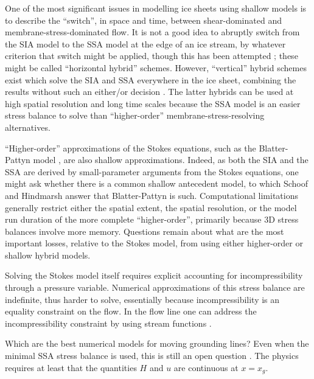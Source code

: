 \documentclass[letterpaper,final,12pt,reqno]{amsart}
\begin{document}
One of the most significant issues in modelling ice sheets using shallow models is to describe the ``switch'', in space and time, between shear-dominated and membrane-stress-dominated flow.  It is not a good idea to abruptly switch from the SIA model to the SSA model at the edge of an ice stream, by whatever criterion that switch might be applied, though this has been attempted \cite{HulbeMacAyeal,Ritzetal2001}; these might be called ``horizontal hybrid'' schemes.  However, ``vertical'' hybrid schemes exist which solve the SIA and SSA everywhere in the ice sheet, combining the results without such an either/or decision \cite{BBssasliding,Goldberg2011,PollardDeConto,Winkelmannetal2011}.  The latter hybrids can be used at high spatial resolution and long time scales because the SSA model is an easier stress balance to solve than ``higher-order'' membrane-stress-resolving alternatives.

``Higher-order'' approximations of the Stokes equations, such as the Blatter-Pattyn model \cite{Blatter,Pattyn03}, are also shallow approximations.  Indeed, as both the SIA and the SSA are derived by small-parameter arguments from the Stokes equations, one might ask whether there is a common shallow antecedent model, to which Schoof and Hindmarsh \cite{SchoofHindmarsh} answer that Blatter-Pattyn is such.  Computational limitations generally restrict either the spatial extent, the spatial resolution, or the model run duration of the more complete ``higher-order'', primarily because 3D stress balances involve more memory.  Questions remain about what are the most important losses, relative to the Stokes model, from using either higher-order \cite{ISMIPHOM} or shallow hybrid models.

Solving the Stokes model itself \cite{ISMIPHOM} requires explicit accounting for incompressibility through a pressure variable.  Numerical approximations of this stress balance are indefinite, thus harder to solve, essentially because incompressibility is an equality constraint on the flow.  In the flow line one can address the incompressibility constraint by using stream functions \cite{BaliseRaymond1985}.

Which are the best numerical models for moving grounding lines?  Even when the minimal SSA stress balance is used, this is still an open question \cite{Goldbergetal2009,SchoofMarine1}.  The physics requires at least that the quantities $H$ and $u$ are continuous at $x=x_g$.
\end{document}
